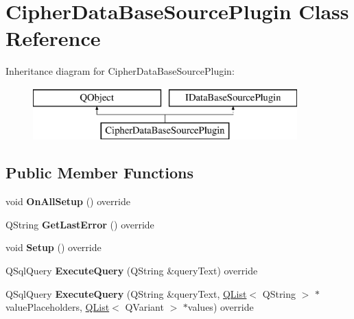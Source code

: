 \hypertarget{class_cipher_data_base_source_plugin}{}\section{Cipher\+Data\+Base\+Source\+Plugin Class Reference}
\label{class_cipher_data_base_source_plugin}
Inheritance diagram for Cipher\+Data\+Base\+Source\+Plugin\+:\begin{figure}[H]
\begin{center}
\leavevmode
\includegraphics[height=2.000000cm]{class_cipher_data_base_source_plugin}
\end{center}
\end{figure}
\subsection*{Public Member Functions}
\begin{DoxyCompactItemize}
\item 
\mbox{\label{class_cipher_data_base_source_plugin_a17963e88c679924dc37da6ded9e71da6}} 
void {\bfseries On\+All\+Setup} () override
\item 
\mbox{\label{class_cipher_data_base_source_plugin_a4a32c746ef184f6cbdc2cfb37c872c5d}} 
Q\+String {\bfseries Get\+Last\+Error} () override
\item 
\mbox{\label{class_cipher_data_base_source_plugin_aeec7843b9e6ad2c36a0e2929a1626436}} 
void {\bfseries Setup} () override
\item 
\mbox{\label{class_cipher_data_base_source_plugin_a02d5a7888d88142660ca6ea5982446ec}} 
Q\+Sql\+Query {\bfseries Execute\+Query} (Q\+String \&query\+Text) override
\item 
\mbox{\label{class_cipher_data_base_source_plugin_aa2abe6b9929628fbb7feb62ed09b1111}} 
Q\+Sql\+Query {\bfseries Execute\+Query} (Q\+String \&query\+Text, \hyperlink{class_q_list}{Q\+List}$<$ Q\+String $>$ $\ast$value\+Placeholders, \hyperlink{class_q_list}{Q\+List}$<$ Q\+Variant $>$ $\ast$values) override
\end{DoxyCompactItemize}



